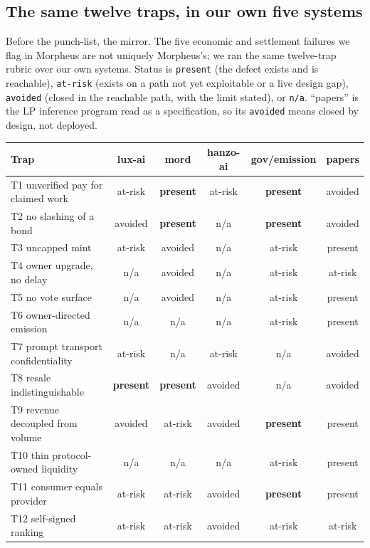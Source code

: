 \documentclass[11pt,a4paper]{article}
\newcommand{\code}[1]{\texttt{\small #1}}
\begin{document}
\subsection{The same twelve traps, in our own five systems}

Before the punch-list, the mirror. The five economic and settlement failures we flag in
Morpheus are not uniquely Morpheus's; we ran the same twelve-trap rubric over our own systems.
Status is \code{present} (the defect exists and is reachable), \code{at-risk} (exists on a path
not yet exploitable or a live design gap), \code{avoided} (closed in the reachable path, with
the limit stated), or \code{n/a}. ``papers'' is the LP inference program read as a
specification, so its \code{avoided} means closed by design, not deployed.

\begin{center}\footnotesize
\begin{tabular}{@{}lccccc@{}}
\toprule
\textbf{Trap} & \textbf{lux-ai} & \textbf{mord} & \textbf{hanzo-ai} & \textbf{gov/emission} & \textbf{papers} \\
\midrule
T1 unverified pay for claimed work & at-risk & \textbf{present} & at-risk & \textbf{present} & avoided \\
T2 no slashing of a bond & avoided & \textbf{present} & n/a & \textbf{present} & avoided \\
T3 uncapped mint & at-risk & avoided & n/a & at-risk & present \\
T4 owner upgrade, no delay & n/a & avoided & n/a & at-risk & at-risk \\
T5 no vote surface & n/a & avoided & n/a & at-risk & present \\
T6 owner-directed emission & n/a & n/a & n/a & at-risk & present \\
T7 prompt transport confidentiality & at-risk & n/a & at-risk & n/a & avoided \\
T8 resale indistinguishable & \textbf{present} & \textbf{present} & avoided & n/a & avoided \\
T9 revenue decoupled from volume & avoided & at-risk & avoided & \textbf{present} & present \\
T10 thin protocol-owned liquidity & n/a & n/a & n/a & at-risk & present \\
T11 consumer equals provider & at-risk & at-risk & avoided & \textbf{present} & present \\
T12 self-signed ranking & at-risk & at-risk & avoided & at-risk & at-risk \\
\bottomrule
\end{tabular}
\end{center}
\end{document}
